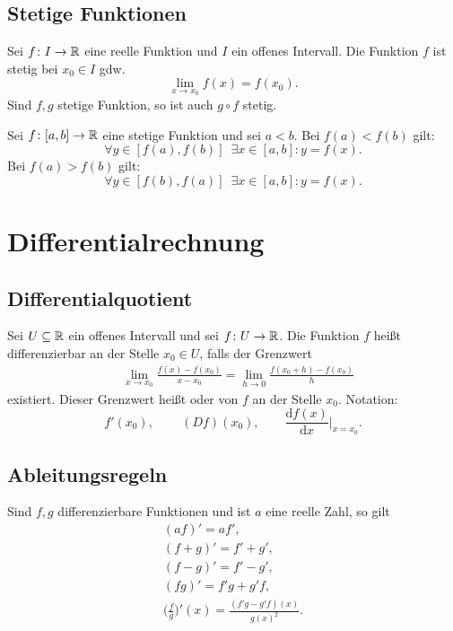 \subsection{Stetige Funktionen}
Sei $f\colon I\to\mathbb R$ eine reelle Funktion und $I$ ein offenes
Intervall. Die Funktion $f$ ist stetig bei $x_0\in I$ gdw.
\begin{equation}
\lim_{x\to x_0} f(x)=f(x_0).
\end{equation}
Sind $f,g$ stetige Funktion, so ist auch $g\circ f$ stetig.

\noindent
{}
Sei $f\colon [a,b]\to\mathbb R$ eine stetige Funktion und sei
$a<b$. Bei $f(a)<f(b)$ gilt:
\begin{equation}
\forall y\in [f(a),f(b)]\enspace\exists x\in [a,b]\colon y=f(x).
\end{equation}
Bei $f(a)>f(b)$ gilt:
\begin{equation}
\forall y\in [f(b),f(a)]\enspace\exists x\in [a,b]\colon y=f(x).
\end{equation}

\newpage
\section{Differentialrechnung}
\subsection{Differentialquotient}
\begin{Definition}
Sei $U\subseteq\mathbb R$ ein offenes Intervall
und sei $f\colon U\to\mathbb R$. Die Funktion $f$ heißt
differenzierbar
an der Stelle $x_0\in U$, falls der Grenzwert
\begin{equation}
\begin{split}
&\lim_{x\to x_0} \frac{f(x)-f(x_0)}{x-x_0}
= \lim_{h\to 0}\frac{f(x_0+h)-f(x_0)}{h}
\end{split}
\end{equation}
existiert. Dieser Grenzwert heißt
 oder 
von $f$ an der Stelle $x_0$. Notation:
\begin{equation}
f'(x_0),\,\qquad (Df)(x_0),\qquad \frac{\mathrm df(x)}{\mathrm dx}\Big|_{x=x_0}.
\end{equation}
\end{Definition}

\subsection{Ableitungsregeln}
Sind $f,g$ differenzierbare Funktionen und ist $a$ eine reelle Zahl,
so gilt
\begin{gather}
(af)' = af',\\
(f+g)' = f'+g',\\
(f-g)' = f'-g',\\
(fg)' = f'g+g'f,\\
\Big(\frac{f}{g}\Big)'(x) = \frac{(f'g-g'f)(x)}{g(x)^2}.
\end{gather}

